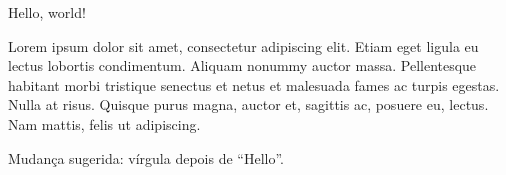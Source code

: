 \documentclass[12pt]{article}
\begin{document}
Hello, world!


Lorem ipsum dolor sit amet, consectetur adipiscing elit. Etiam eget ligula eu lectus lobortis condimentum. Aliquam nonummy auctor massa. Pellentesque habitant morbi tristique senectus et netus et malesuada fames ac turpis egestas. Nulla at risus. Quisque purus magna, auctor et, sagittis ac, posuere eu, lectus. Nam mattis, felis ut adipiscing.

Mudança sugerida: vírgula depois de ``Hello''.
\end{document}
